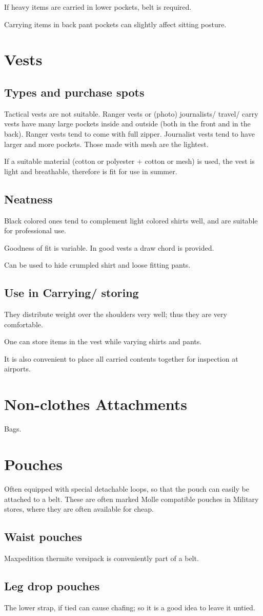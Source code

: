 \documentclass[oneside, article]{memoir}
\begin{document}
If heavy items are carried in lower pockets, belt is required.

Carrying items in back pant pockets can slightly affect sitting posture.

\section{Vests}
\subsection{Types and purchase spots}
Tactical vests are not suitable. Ranger vests or (photo) journalists/ travel/ carry vests have many large pockets inside and outside (both in the front and in the back). Ranger vests tend to come with full zipper. Journalist vests tend to have larger and more pockets. Those made with mesh are the lightest.

If a suitable material (cotton or polyester + cotton or mesh) is used, the vest is light and breathable, therefore is fit for use in summer.

\subsection{Neatness}
Black colored ones tend to complement light colored shirts well, and are suitable for professional use.

Goodness of fit is variable. In good vests a draw chord is provided.

Can be used to hide crumpled shirt and loose fitting pants.

\subsection{Use in Carrying/ storing}
They distribute weight over the shoulders very well; thus they are very comfortable.

One can store items in the vest while varying shirts and pants.

It is also convenient to place all carried contents together for inspection at airports.

\section{Non-clothes Attachments}
Bags.

\section{Pouches}
Often equipped with special detachable loops, so that the pouch can easily be attached to a belt. These are often marked Molle compatible pouches in Military stores, where they are often available for cheap.

\subsection{Waist pouches}
Maxpedition thermite versipack is conveniently part of a belt.

\subsection{Leg drop pouches}
The lower strap, if tied can cause chafing; so it is a good idea to leave it untied.
\end{document}

